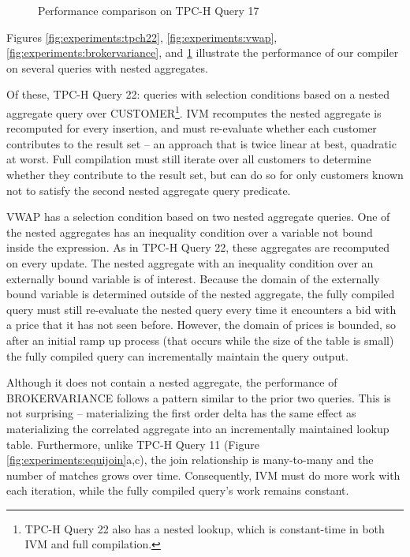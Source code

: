 \begin{figure}
\begin{center}
\caption{Performance comparison on TPC-H Query 17}
\label{fig:experiments:tpch17}
\end{center}
\end{figure}

Figures \ref{fig:experiments:tpch22}, \ref{fig:experiments:vwap}, \ref{fig:experiments:brokervariance}, and \ref{fig:experiments:tpch17} illustrate the performance of our compiler on several queries with nested aggregates.  

Of these, TPC-H Query 22: queries with selection conditions based on a nested aggregate query over CUSTOMER\footnote{TPC-H Query 22 also has a nested lookup, which is constant-time in both IVM and full compilation.}.  IVM recomputes the nested aggregate is recomputed for every insertion, and must re-evaluate whether each customer contributes to the result set -- an approach that is twice linear at best, quadratic at worst.  Full compilation must still iterate over all customers to determine whether they contribute to the result set, but can do so for only customers known not to satisfy the second nested aggregate query predicate.

VWAP has a selection condition based on two nested aggregate queries.  One of the nested aggregates has an inequality condition over a variable not bound inside the expression.  As in TPC-H Query 22, these aggregates are recomputed on every update.  The nested aggregate with an inequality condition over an externally bound variable is of interest.  Because the domain of the externally bound variable is determined outside of the nested aggregate, the fully compiled query must still re-evaluate the nested query every time it encounters a bid with a price that it has not seen before.  However, the domain of prices is bounded, so after an initial ramp up process (that occurs while the size of the table is small) the fully compiled query can incrementally maintain the query output.

Although it does not contain a nested aggregate, the performance of BROKERVARIANCE follows a pattern similar to the prior two queries.  This is not surprising -- materializing the first order delta has the same effect as materializing the correlated aggregate into an incrementally maintained lookup table.  Furthermore, unlike TPC-H Query 11 (Figure \ref{fig:experiments:equijoin}a,c), the join relationship is many-to-many and the number of matches grows over time.  Consequently, IVM must do more work with each iteration, while the fully compiled query's work remains constant.

